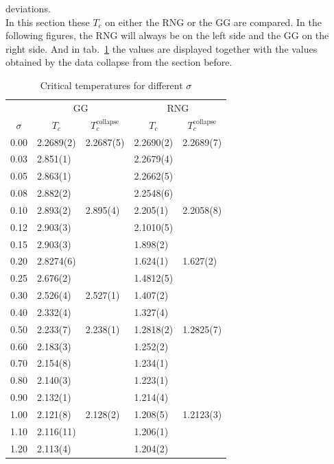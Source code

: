     deviations.\\
    In this section these \(T_c\) on either the RNG or the GG are
    compared. In the following figures, the RNG will always be on the
    left side and the GG on the right side.
    And in tab.\ \ref{tab:critTemp} the values are displayed together with the
    values obtained by the data collapse from the section before.
    \begin{table}[htbp]
        \center
        \begin{tabular}{l l l l l}
            \toprule
             & \multicolumn{2}{c}{GG} & \multicolumn{2}{c}{RNG}\\
            \cmidrule(rl){2-3} \cmidrule(rl){4-5}
            \multicolumn{1}{c}{\(\sigma\)} & \multicolumn{1}{c}{\(T_c\)} & \multicolumn{1}{c}{\(T_c^{\mathrm{collapse}}\)} & \multicolumn{1}{c}{\(T_c\)} & \multicolumn{1}{c}{\(T_c^{\mathrm{collapse}}\)}\\
            \midrule
            0.00 & 2.2689(2)& 2.2687(5) & 2.2690(2)& 2.2689(7)\\
            0.03 & 2.851(1) &           & 2.2679(4)&          \\
            0.05 & 2.863(1) &           & 2.2662(5)&          \\
            0.08 & 2.882(2) &           & 2.2548(6)&          \\
            0.10 & 2.893(2) & 2.895(4)  & 2.205(1) & 2.2058(8)\\
            0.12 & 2.903(3) &           & 2.1010(5)&          \\
            0.15 & 2.903(3) &           & 1.898(2) &          \\
            0.20 & 2.8274(6)&           & 1.624(1) & 1.627(2) \\
            0.25 & 2.676(2) &           & 1.4812(5)&          \\
            0.30 & 2.526(4) & 2.527(1)  & 1.407(2) &          \\
            0.40 & 2.332(4) &           & 1.327(4) &          \\
            0.50 & 2.233(7) & 2.238(1)  & 1.2818(2)& 1.2825(7)\\
            0.60 & 2.183(3) &           & 1.252(2) &          \\
            0.70 & 2.154(8) &           & 1.234(1) &          \\
            0.80 & 2.140(3) &           & 1.223(1) &          \\
            0.90 & 2.132(1) &           & 1.214(4) &          \\
            1.00 & 2.121(8) & 2.128(2)  & 1.208(5) & 1.2123(3)\\
            1.10 & 2.116(11)&           & 1.206(1) &          \\
            1.20 & 2.113(4) &           & 1.204(2) &          \\
            \bottomrule
        \end{tabular}
        \caption[Critical Temperatures for Different $\sigma$]{Critical temperatures for different $\sigma$}
        \label{tab:critTemp}
    \end{table}\\
